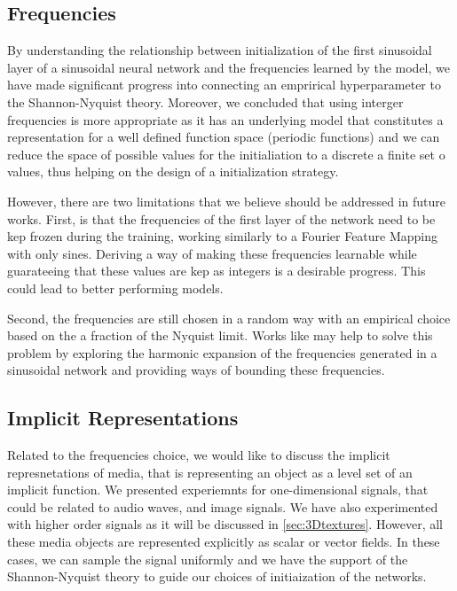 \subsection{Frequencies}

By understanding the relationship between initialization of the first sinusoidal layer of a sinusoidal neural network and the frequencies learned by the model, we have made significant progress into connecting an emprirical hyperparameter to the Shannon-Nyquist theory. Moreover, we concluded that using interger frequencies is more appropriate as it has an underlying model that constitutes a representation for a well defined function space (periodic functions) and we can reduce the space of possible values for the initialiation to a discrete a finite set o values, thus helping on the design of a initialization strategy. 

However, there are two limitations that we believe should be addressed in future works. First, is that the frequencies of the first layer of the network need to be kep frozen during the training, working similarly to a Fourier Feature Mapping with only sines. Deriving a way of making these frequencies learnable while guarateeing that these values are kep as integers is a desirable progress. This could lead to better performing models.

Second, the frequencies are still chosen in a random way with an empirical choice based on the a fraction of the Nyquist limit. Works like \cite{tamingFactory} may help to solve this problem by exploring the harmonic expansion of the frequencies generated in a sinusoidal network and providing ways of bounding these frequencies.

\subsection{Implicit Representations}

Related to the frequencies choice, we would like to discuss the implicit represnetations of media, that is representing an object as a level set of an implicit function. We presented experiemnts for one-dimensional signals, that could be related to audio waves, and image signals. We have also experimented with higher order signals as it will be discussed in \ref{sec:3Dtextures}. However, all these media objects are represented explicitly as scalar or vector fields. In these cases, we can sample the signal uniformly and we have the support of the Shannon-Nyquist theory to guide our choices of initiaization of the networks.

